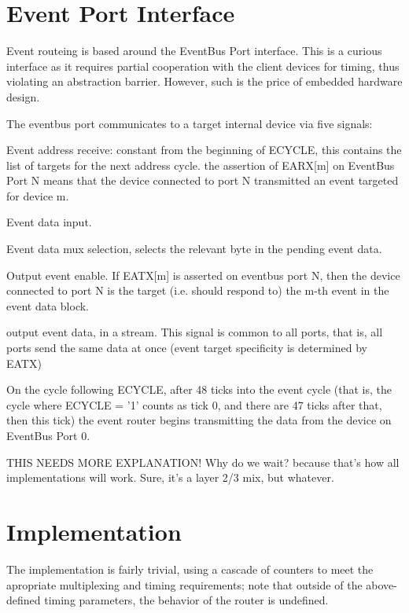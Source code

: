 
\section{Event Port Interface}

Event routeing is based around the EventBus Port interface. This is a
curious interface as it requires partial cooperation with the client
devices for timing, thus violating an abstraction barrier. However,
such is the price of embedded hardware design.


The eventbus port communicates to a target internal device via five signals:

 Event address receive: constant from the
beginning of ECYCLE, this contains the list of targets for the next
address cycle. the assertion of EARX[m] on EventBus Port N means that
the device connected to port N transmitted an event targeted for
device m.

 Event data input. 

 Event data mux selection, selects the relevant
byte in the pending event data.

 Output event enable. If EATX[m] is asserted on
eventbus port N, then the device connected to port N is the target
(i.e. should respond to) the m-th event in the event data block.

 output event data, in a stream. This signal is common to all ports, that is, all ports send the same data at once (event target specificity is determined by EATX)

On the cycle following ECYCLE, after 48 ticks into the event cycle
(that is, the cycle where ECYCLE = '1' counts as tick 0, and there are
47 ticks after that, then this tick) the event router begins
transmitting the data from the device on EventBus Port 0.

THIS NEEDS MORE EXPLANATION! 
Why do we wait? because that's how all implementations will work. Sure, it's a layer 2/3 mix, but whatever. 


\section{Implementation}

The implementation is fairly trivial, using a cascade of counters to
meet the apropriate multiplexing and timing requirements; note that
outside of the above-defined timing parameters, the behavior of the
router is undefined.

